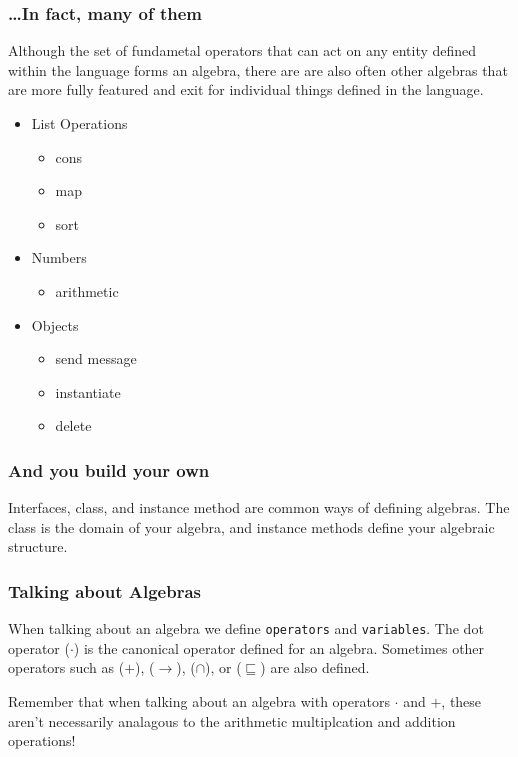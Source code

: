 \documentclass{beamer}
\begin{document}
\begin{frame}
  \frametitle{\dots In fact, many of them}
  Although the set of fundametal operators that can act on any entity
  defined within the language forms an algebra, there are are also
  often other algebras that are more fully featured and exit for
  individual things defined in the language.
  \begin{itemize}
    \item List Operations
      \begin{itemize}
        \item cons
        \item map
        \item sort
      \end{itemize}
    \item Numbers
      \begin{itemize}
        \item arithmetic
      \end{itemize}
    \item Objects
      \begin{itemize}
        \item send message
        \item instantiate
        \item delete
      \end{itemize}
  \end{itemize}
\end{frame}

\begin{frame}
  \frametitle{And you build your own}
  Interfaces, class, and instance method are common ways of defining
  algebras.  The class is the domain of your algebra, and instance
  methods define your algebraic structure.
\end{frame}

\begin{frame}
  \frametitle{Talking about Algebras}

  When talking about an algebra we define {\tt operators} and
  {\tt variables}.  The dot operator ($\cdot$) is the canonical
  operator defined for an algebra.  Sometimes other operators such as
  ($+$), ($\rightarrow$), ($\cap$), or ($\sqsubseteq$) are also
  defined.

  Remember that when talking about an algebra with operators $\cdot$
  and $+$, these aren't necessarily analagous to the arithmetic
  multiplcation and addition operations!
\end{frame}
\end{document}

